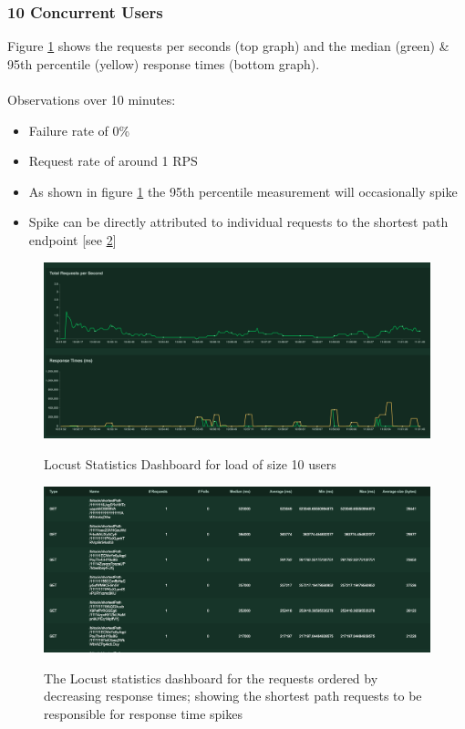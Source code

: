 \subsubsection{10 Concurrent Users}
Figure \ref{fig:10-users-original} shows the requests per seconds (top graph) and the median (green) \& 95th percentile (yellow) response times (bottom graph). 
\\\\
Observations over 10 minutes:
\begin{itemize}
    \item Failure rate of 0\%
    \item Request rate of around 1 RPS
    \item As shown in figure \ref{fig:10-users-original} the 95th percentile measurement will occasionally spike
    \item Spike can be directly attributed to individual requests to the shortest path endpoint [see \ref{fig:10-users-original-culprit}]
\end{itemize}

\begin{figure}
  \centering
  \includegraphics[width = 22cm]{./figures/10-users-original}\\[0.5cm] 
  \caption{Locust Statistics Dashboard for load of size 10 users}
  \label{fig:10-users-original}
\end{figure}

\begin{figure}[h!]
  \centering
  \includegraphics[width = 15cm]{./figures/10-users-original-culprit}\\[0.5cm]
  \caption{The Locust statistics dashboard for the requests ordered by decreasing response times; showing the shortest path requests to be responsible for response time spikes}
  \label{fig:10-users-original-culprit}
\end{figure}

